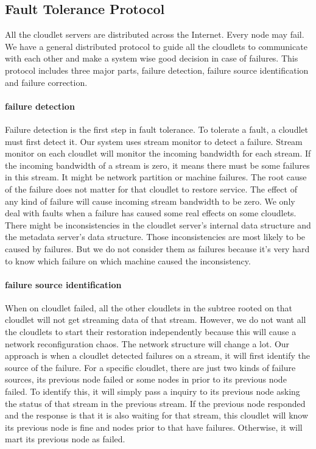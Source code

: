 \documentclass[letterpaper,twocolumn,10pt]{article}
\begin{document}
\subsection{Fault Tolerance Protocol}
All the cloudlet servers are distributed across the Internet. Every node may fail. We have a general distributed protocol to guide all the cloudlets to communicate with each other and make a system wise good decision in case of failures. This protocol includes three major parts, failure detection, failure source identification and failure correction.

\paragraph{failure detection}
Failure detection is the first step in fault tolerance. To tolerate a fault, a cloudlet must first detect it. Our system uses stream monitor to detect a failure. Stream monitor on each cloudlet will monitor the incoming bandwidth for each stream. If the incoming bandwidth of a stream is zero, it means there must be some failures in this stream. It might be network partition or machine failures. The root cause of the failure does not matter for that cloudlet to restore service. The effect of any kind of failure will cause incoming stream bandwidth to be zero. We only deal with faults when a failure has caused some real effects on some cloudlets. There might be inconsistencies in the cloudlet server's internal data structure and the metadata server's data structure. Those inconsistencies are most likely to be caused by failures. But we do not consider them as failures because it's very hard to know which failure on which machine caused the inconsistency.

\paragraph{failure source identification}
When on cloudlet failed, all the other cloudlets in the subtree rooted on that cloudlet will not get streaming data of that stream. However, we do not want all the cloudlets to start their restoration independently because this will cause a network reconfiguration chaos. The network structure will change a lot. Our approach is when a cloudlet detected failures on a stream, it will first identify the source of the failure. For a specific cloudlet, there are just two kinds of failure sources, its previous node failed or some nodes in prior to its previous node failed. To identify this, it will simply pass a inquiry to its previous node asking the status of that stream in the previous stream. If the previous node responded and the response is that it is also waiting for that stream, this cloudlet will know its previous node is fine and nodes prior to that have failures. Otherwise, it will mart its previous node as failed.
\end{document}
